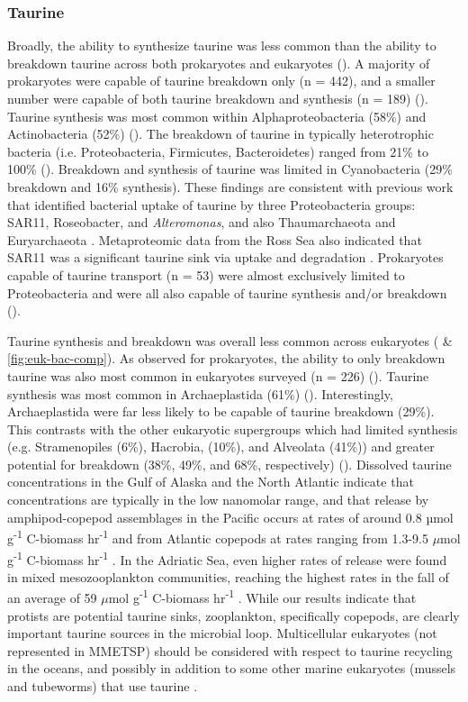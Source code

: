\documentclass[utf8]{frontiersSCNS} %
\begin{document}
\subsubsection*{Taurine}
Broadly, the ability to synthesize taurine was less common than the ability to breakdown taurine across both prokaryotes and eukaryotes (). A majority of prokaryotes were capable of taurine breakdown only (n = 442), and a smaller number were capable of both taurine breakdown and synthesis (n = 189) (). Taurine synthesis was most common within Alphaproteobacteria (58\%) and Actinobacteria (52\%) (). The breakdown of taurine in typically heterotrophic bacteria (i.e. Proteobacteria, Firmicutes, Bacteroidetes) ranged from 21\% to 100\% (). Breakdown and synthesis of taurine was limited in Cyanobacteria (29\% breakdown and 16\% synthesis). These findings are consistent with previous work that identified bacterial uptake of taurine by three Proteobacteria groups: SAR11, Roseobacter, and \emph{Alteromonas}, and also Thaumarchaeota and Euryarchaeota \citep{Clifford2020,Clifford2019}. Metaproteomic data from the Ross Sea also indicated that SAR11 was a significant taurine sink via uptake and degradation \citep{Williams2012}. Prokaryotes capable of taurine transport (n = 53) were almost exclusively limited to Proteobacteria and were all also capable of taurine synthesis and/or breakdown (). 

Taurine synthesis and breakdown was overall less common across eukaryotes ( \& \ref{fig:euk-bac-comp}). As observed for prokaryotes, the ability to only breakdown taurine was also most common in eukaryotes surveyed (n = 226) (). Taurine synthesis was most common in Archaeplastida (61\%) (). Interestingly, Archaeplastida were far less likely to be capable of taurine breakdown (29\%). This contrasts with the other eukaryotic supergroups which had limited synthesis (e.g. Stramenopiles (6\%), Hacrobia, (10\%), and Alveolata (41\%)) and greater potential for breakdown (38\%, 49\%, and 68\%, respectively) (). Dissolved taurine concentrations in the Gulf of Alaska and the North Atlantic indicate that concentrations are typically in the low nanomolar range, and that release by amphipod-copepod assemblages in the Pacific occurs at rates of around 0.8 µmol g\textsuperscript{-1} C-biomass hr\textsuperscript{-1} and from Atlantic copepods at rates ranging from 1.3-9.5 $\mu$mol g\textsuperscript{-1} C-biomass hr\textsuperscript{-1} \citep{Clifford2017}. In the Adriatic Sea, even higher rates of release were found in mixed mesozooplankton communities, reaching the highest rates in the fall of an average of 59 $\mu$mol g\textsuperscript{-1} C-biomass hr\textsuperscript{-1} \citep{Clifford2020}. While our results indicate that protists are potential taurine sinks, zooplankton, specifically copepods, are clearly important taurine sources in the microbial loop. Multicellular eukaryotes (not represented in MMETSP) should be considered with respect to taurine recycling in the oceans, and possibly in addition to some other marine eukaryotes (mussels and tubeworms) that use taurine \citep{Yin2000,Hosoi2005}.
\end{document}
